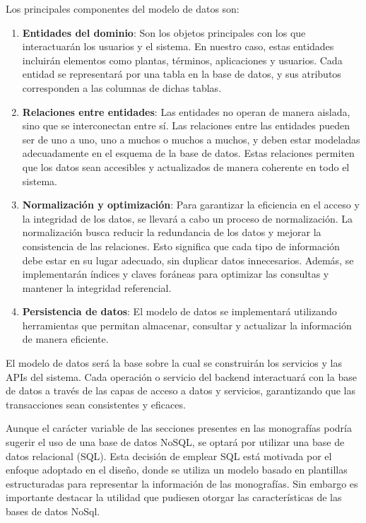 Los principales componentes del modelo de datos son:

\begin{enumerate} 
    \item \textbf{Entidades del dominio}: Son los objetos principales con los que interactuarán los usuarios y el sistema. 
    En nuestro caso, estas entidades incluirán elementos como plantas, términos, aplicaciones y usuarios. Cada entidad se representará 
    por una tabla en la base de datos, y sus atributos corresponden a las columnas de dichas tablas.
    \item \textbf{Relaciones entre entidades}: Las entidades no operan de manera aislada, sino que se interconectan entre sí. Las relaciones 
    entre las entidades pueden ser de uno a uno, uno a muchos o muchos a muchos, y deben estar modeladas adecuadamente en el esquema de la 
    base de datos. Estas relaciones permiten que los datos sean accesibles y actualizados de manera coherente en todo el sistema.
    \item \textbf{Normalización y optimización}: Para garantizar la eficiencia en el acceso y la integridad de los datos, se llevará a cabo un 
    proceso de normalización. La normalización busca reducir la redundancia de los datos y mejorar la consistencia de las relaciones. Esto significa 
    que cada tipo de información debe estar en su lugar adecuado, sin duplicar datos innecesarios.
    Además, se implementarán índices y claves foráneas para optimizar las consultas y mantener la integridad referencial.
    \item \textbf{Persistencia de datos}: El modelo de datos se implementará utilizando herramientas que permitan almacenar, consultar y actualizar la información de manera eficiente.
\end{enumerate}

El modelo de datos será la base sobre la cual se construirán los servicios y las APIs del sistema. Cada operación o servicio del backend interactuará con la base de datos a través 
de las capas de acceso a datos y servicios, garantizando que las transacciones sean consistentes y eficaces.

Aunque el carácter variable de las secciones presentes en las monografías podría sugerir el uso de una base de datos NoSQL, se optará por utilizar una base de datos relacional (SQL).
Esta decisión de emplear SQL está motivada por el enfoque adoptado en el diseño, donde se utiliza un modelo basado en plantillas estructuradas para representar la información de las monografías.
Sin embargo es importante destacar la utilidad que pudiesen otorgar las características de las bases de datos NoSql.

